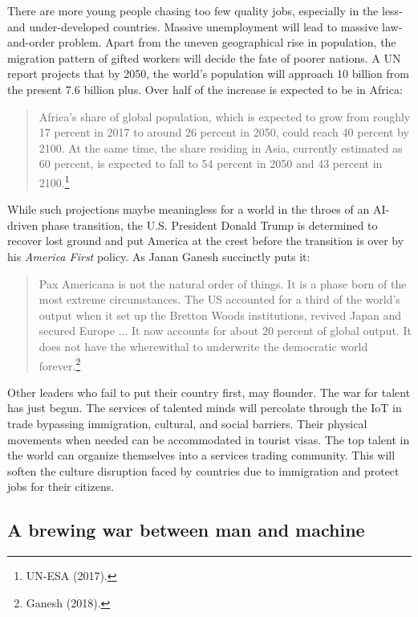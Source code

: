 \begin{multicols}{2}
There are more young people chasing too few quality jobs, especially in the less- and under-developed countries. Massive unemployment will lead to massive law-and-order problem. Apart from the uneven geographical rise in population, the migration pattern of gifted workers will decide the fate of poorer nations. A UN report projects that by 2050, the world's population will approach 10 billion from the present 7.6 billion plus. Over half of the increase is expected to be in Africa:
\begin{quote}
Africa's share of global population, which is expected to grow from roughly 17 percent in 2017 to around 26 percent in 2050, could reach 40 percent by 2100. At the same time, the share residing in Asia, currently estimated as 60 percent, is expected to fall to 54 percent in 2050 and 43 percent in 2100.\footnote{UN-ESA (2017).}
\end{quote}

While such projections maybe meaningless for a world in the throes of an AI-driven phase transition, the U.S. President Donald Trump is determined to recover lost ground and put America at the crest before the transition is over by his \textit{America First} policy. As Janan Ganesh succinctly puts it:
\begin{quote}
Pax Americana is not the natural order of things. It is a phase born of the most extreme circumstances. The US accounted for a third of the world's output when it set up the Bretton Woods institutions, revived Japan and secured Europe ... It now accounts for about 20 percent of global output. It does not have the wherewithal to underwrite the democratic world forever.\footnote{Ganesh (2018).}
\end{quote}

Other leaders who fail to put their country first, may flounder. The war for talent has just begun. The services of talented minds will percolate through the IoT in trade bypassing immigration, cultural, and social barriers. Their physical movements when needed can be accommodated in tourist visas. The top talent in the world can organize themselves into a services trading community. This will soften the culture disruption faced by countries due to immigration and protect jobs for their citizens.

\subsection{A brewing war between man and machine}


\end{multicols}
